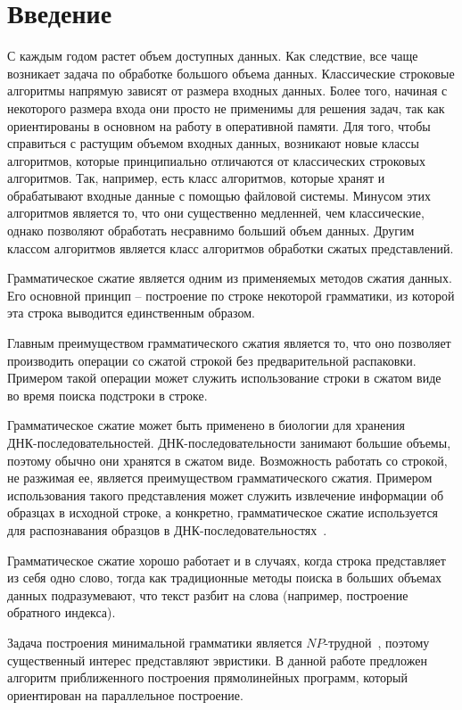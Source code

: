 \documentclass[12pt,a4paper]{extarticle}
\theoremstyle{break}
\begin{document}
\tableofcontents

\newpage
\section{Введение}
С каждым годом растет объем доступных данных. Как следствие, все чаще возникает
задача по обработке большого объема данных. Классические строковые алгоритмы
напрямую зависят от размера входных данных. Более того, начиная с некоторого
размера входа они просто не применимы для решения задач, так как ориентированы в
основном на работу в оперативной памяти. Для того, чтобы справиться с растущим
объемом входных данных, возникают новые классы алгоритмов, которые принципиально
отличаются от классических строковых алгоритмов. Так, например, есть класс
алгоритмов, которые хранят и обрабатывают входные данные с помощью файловой
системы. Минусом этих алгоритмов является то, что  они существенно медленней,
чем классические, однако позволяют обработать несравнимо больший объем данных.
Другим классом алгоритмов является класс алгоритмов обработки сжатых
представлений.

Грамматическое сжатие является одним из применяемых методов сжатия данных.
Его основной принцип -- построение по строке некоторой грамматики, из которой эта строка
выводится единственным образом.

Главным преимуществом грамматического сжатия является то, что оно позволяет
производить операции со сжатой строкой без предварительной распаковки. Примером
такой операции может служить использование строки в сжатом виде во время поиска
подстроки в строке.

Грамматическое сжатие может быть применено в биологии для хранения
\\ДНК-последовательностей. ДНК-последовательности занимают большие объемы,
поэтому обычно они хранятся в сжатом виде. Возможность работать со строкой, не
разжимая ее, является преимуществом грамматического сжатия. Примером
использования такого представления может служить извлечение информации об
образцах в исходной строке, а конкретно, грамматическое сжатие используется для
распознавания образцов в ДНК-последовательностях~\cite{appr_alg}.

Грамматическое сжатие хорошо работает и в случаях, когда строка представляет из
себя одно слово, тогда как традиционные методы поиска в больших объемах данных
подразумевают, что текст разбит на слова (например, построение обратного
индекса).

Задача построения минимальной грамматики является $NP$-трудной~\cite{np},
поэтому существенный интерес представляют эвристики. В данной
работе предложен алгоритм приближенного построения прямолинейных программ,
который ориентирован на параллельное построение.
\end{document}
